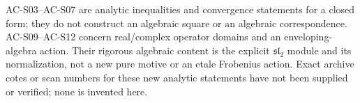 AC-S03--AC-S07 are analytic inequalities and convergence statements
for a closed form; they do not construct an algebraic square or an
algebraic correspondence.  AC-S09--AC-S12 concern real/complex
operator domains and an enveloping-algebra action.  Their rigorous
algebraic content is the explicit \(\mathfrak{sl}_2\) module and its
normalization, not a new pure motive or an etale Frobenius action.
Exact archive cotes or scan numbers for these new analytic statements
have not been supplied or verified; none is invented here.
